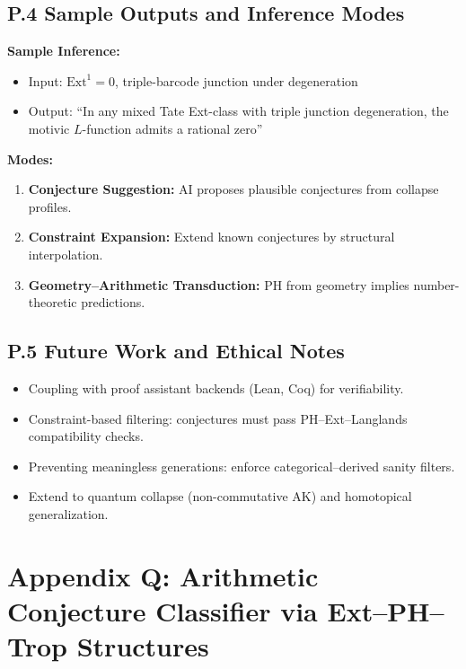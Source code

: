 \documentclass[11pt]{article}
\begin{document}
\subsection*{P.4 Sample Outputs and Inference Modes}

\textbf{Sample Inference:}

\begin{itemize}
  \item Input: \( \mathrm{Ext}^1 = 0 \), triple-barcode junction under degeneration
  \item Output: “In any mixed Tate Ext-class with triple junction degeneration, the motivic $L$-function admits a rational zero”
\end{itemize}

\textbf{Modes:}
\begin{enumerate}
  \item \textbf{Conjecture Suggestion:} AI proposes plausible conjectures from collapse profiles.
  \item \textbf{Constraint Expansion:} Extend known conjectures by structural interpolation.
  \item \textbf{Geometry–Arithmetic Transduction:} PH from geometry implies number-theoretic predictions.
\end{enumerate}

\subsection*{P.5 Future Work and Ethical Notes}

\begin{itemize}
  \item Coupling with proof assistant backends (Lean, Coq) for verifiability.
  \item Constraint-based filtering: conjectures must pass PH–Ext–Langlands compatibility checks.
  \item Preventing meaningless generations: enforce categorical–derived sanity filters.
  \item Extend to quantum collapse (non-commutative AK) and homotopical generalization.
\end{itemize}



\section*{Appendix Q: Arithmetic Conjecture Classifier via Ext–PH–Trop Structures}
\end{document}
